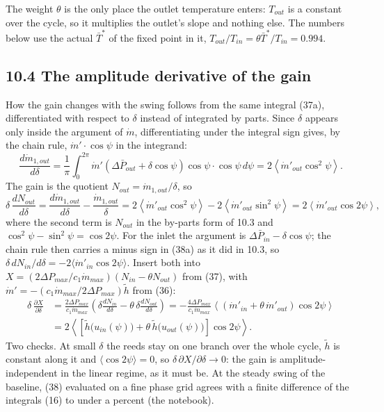 \documentclass[11pt]{article}
\begin{document}
The weight $\theta$ is the only place the outlet temperature enters: $T_{out}$ is a constant over the cycle, so it multiplies the outlet's slope and nothing else. The numbers below use the actual $\bar T^*$ of the fixed point in it, $T_{out}/T_{in} = \theta\bar T^*/T_{in} = 0.994$.

\subsection*{10.4 The amplitude derivative of the gain}

How the gain changes with the swing follows from the same integral (37a), differentiated with respect to $\delta$ instead of integrated by parts. Since $\delta$ appears only inside the argument of $\dot m$, differentiating under the integral sign gives, by the chain rule, $\dot m'\cdot\cos\psi$ in the integrand:
\begin{equation}
\frac{d\dot m_{1,out}}{d\delta} = \frac{1}{\pi}\int_0^{2\pi}\dot m'\left(\Delta\bar P_{out} + \delta\cos\psi\right)\cos\psi\cdot\cos\psi\,d\psi = 2\left\langle\dot m'_{out}\cos^2\psi\right\rangle . \tag{38a}
\end{equation}
The gain is the quotient $N_{out} = \dot m_{1,out}/\delta$, so
\begin{equation}
\delta\,\frac{dN_{out}}{d\delta} = \frac{d\dot m_{1,out}}{d\delta} - \frac{\dot m_{1,out}}{\delta} = 2\left\langle\dot m'_{out}\cos^2\psi\right\rangle - 2\left\langle\dot m'_{out}\sin^2\psi\right\rangle = 2\left\langle\dot m'_{out}\cos 2\psi\right\rangle , \tag{38b}
\end{equation}
where the second term is $N_{out}$ in the by-parts form of 10.3 and $\cos^2\psi - \sin^2\psi = \cos 2\psi$. For the inlet the argument is $\Delta\bar P_{in} - \delta\cos\psi$; the chain rule then carries a minus sign in (38a) as it did in 10.3, so $\delta\,dN_{in}/d\delta = -2\langle\dot m'_{in}\cos 2\psi\rangle$. Insert both into $X = (2\Delta P_{max}/c_1\dot m_{max})(N_{in} - \theta N_{out})$ from (37), with $\dot m' = -(c_1\dot m_{max}/2\Delta P_{max})\tilde h$ from (36):
\begin{equation}
\begin{aligned}
\delta\,\frac{\partial X}{\partial\delta} &= \frac{2\Delta P_{max}}{c_1\dot m_{max}}\left(\delta\frac{dN_{in}}{d\delta} - \theta\,\delta\frac{dN_{out}}{d\delta}\right)
= -\frac{4\Delta P_{max}}{c_1\dot m_{max}}\left\langle\left(\dot m'_{in} + \theta\,\dot m'_{out}\right)\cos 2\psi\right\rangle \\
&= 2\left\langle\left[\tilde h\big(u_{in}(\psi)\big) + \theta\,\tilde h\big(u_{out}(\psi)\big)\right]\cos 2\psi\right\rangle .
\end{aligned} \tag{38}
\end{equation}
Two checks. At small $\delta$ the reeds stay on one branch over the whole cycle, $\tilde h$ is constant along it and $\langle\cos 2\psi\rangle = 0$, so $\delta\,\partial X/\partial\delta \to 0$: the gain is amplitude-independent in the linear regime, as it must be. At the steady swing of the baseline, (38) evaluated on a fine phase grid agrees with a finite difference of the integrals (16) to under a percent (the notebook).
\end{document}
